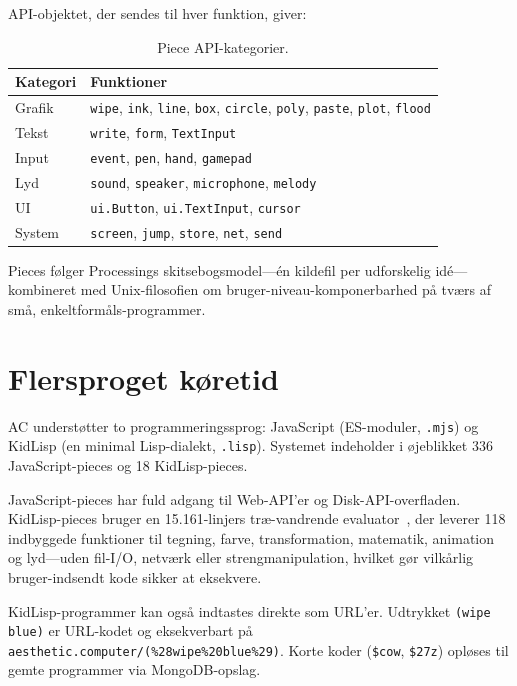 \documentclass[10pt,letterpaper,twocolumn]{article}
\begin{document}
API-objektet, der sendes til hver funktion, giver:

\begin{table}[h]
\small
\centering
\begin{tabularx}{\columnwidth}{lX}
\toprule
\textbf{Kategori} & \textbf{Funktioner} \\
\midrule
Grafik & \texttt{wipe}, \texttt{ink}, \texttt{line}, \texttt{box}, \texttt{circle}, \texttt{poly}, \texttt{paste}, \texttt{plot}, \texttt{flood} \\
Tekst & \texttt{write}, \texttt{form}, \texttt{TextInput} \\
Input & \texttt{event}, \texttt{pen}, \texttt{hand}, \texttt{gamepad} \\
Lyd & \texttt{sound}, \texttt{speaker}, \texttt{microphone}, \texttt{melody} \\
UI & \texttt{ui.Button}, \texttt{ui.TextInput}, \texttt{cursor} \\
System & \texttt{screen}, \texttt{jump}, \texttt{store}, \texttt{net}, \texttt{send} \\
\bottomrule
\end{tabularx}
\caption{Piece API-kategorier.}
\label{tab:api}
\end{table}

Pieces følger Processings skitsebogsmodel---én kildefil per udforskelig idé---kombineret med Unix-filosofien om bruger-niveau-komponerbarhed på tværs af små, enkeltformåls-programmer.


\section{Flersproget køretid}
\label{sec:languages}

AC understøtter to programmeringssprog: JavaScript (ES-moduler, \texttt{.mjs}) og KidLisp (en minimal Lisp-dialekt, \texttt{.lisp}). Systemet indeholder i øjeblikket 336 JavaScript-pieces og 18 KidLisp-pieces.

JavaScript-pieces har fuld adgang til Web-API'er og Disk-API-overfladen. KidLisp-pieces bruger en 15.161-linjers træ-vandrende evaluator~\citep{scudder2026kidlisp}, der leverer 118 indbyggede funktioner til tegning, farve, transformation, matematik, animation og lyd---uden fil-I/O, netværk eller strengmanipulation, hvilket gør vilkårlig bruger-indsendt kode sikker at eksekvere.

KidLisp-programmer kan også indtastes direkte som URL'er. Udtrykket \texttt{(wipe blue)} er URL-kodet og eksekverbart på \texttt{aesthetic.computer/(\%28wipe\%20blue\%29)}. Korte koder (\texttt{\$cow}, \texttt{\$27z}) opløses til gemte programmer via MongoDB-opslag.
\end{document}
